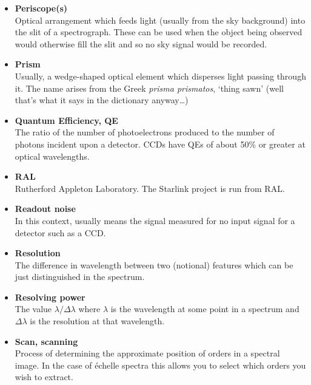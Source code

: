 {{\begin{itemize}
\item {\bf\label{gl_periscopes}Periscope(s)}\\
      Optical arrangement which feeds light (usually from the sky
      background) into the slit of a spectrograph.  These can be used
      when the object being observed would otherwise fill the slit
      and so no sky signal would be recorded.

\item {\bf\label{gl_prism}Prism}\\
      Usually, a wedge-shaped optical element which disperses light
      passing through it.  The name arises from the Greek {\sl prisma
      prismatos}, `thing sawn' (well that's what it says in the
      dictionary anyway\ldots)

\item {\bf\label{gl_qe}Quantum Efficiency, QE}\\
      The ratio of the number of photoelectrons produced to the number
      of photons incident upon a detector.  CCDs have QEs of about
      50\% or greater at optical wavelengths.

\item {\bf\label{gl_ral}RAL}\\
      Rutherford Appleton Laboratory.
      The Starlink project is run from RAL.

\item {\bf\label{gl_readout_noise}Readout noise}\\
      In this context, usually means the signal measured for no input
      signal for a detector such as a CCD.

\item {\bf\label{gl_resolution}Resolution}\\
      The difference in wavelength between two (notional) features
      which can be just distinguished in the spectrum.

\item {\bf\label{gl_resolving_power}Resolving power}\\
      The value $\lambda/\Delta\lambda$ where $\lambda$ is the wavelength
      at some point in a spectrum and $\Delta\lambda$ is the resolution
      at that wavelength.

\item {\bf\label{gl_scanning}Scan, scanning}\\
      Process of determining the approximate position of orders in a
      spectral image.  In the case of \'{e}chelle spectra this allows
      you to select which orders you wish to extract.


\end{itemize}}}
